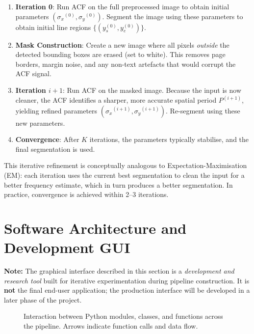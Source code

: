 \documentclass[12pt, a4paper]{article}
\begin{document}
\begin{enumerate}
    \item \textbf{Iteration 0}: Run ACF on the full preprocessed image to obtain initial parameters $({\sigma_x}^{(0)}, {\sigma_y}^{(0)})$. Segment the image using these parameters to obtain initial line regions $\{(y_s^{(0)}, y_e^{(0)})\}$.

    \item \textbf{Mask Construction}: Create a new image where all pixels \emph{outside} the detected bounding boxes are erased (set to white). This removes page borders, margin noise, and any non-text artefacts that would corrupt the ACF signal.

    \item \textbf{Iteration $i+1$}: Run ACF on the masked image. Because the input is now cleaner, the ACF identifies a sharper, more accurate spatial period $P^{(i+1)}$, yielding refined parameters $({\sigma_x}^{(i+1)}, {\sigma_y}^{(i+1)})$. Re-segment using these new parameters.

    \item \textbf{Convergence}: After $K$ iterations, the parameters typically stabilise, and the final segmentation is used.
\end{enumerate}

This iterative refinement is conceptually analogous to Expectation-Maximisation (EM): each iteration uses the current best segmentation to clean the input for a better frequency estimate, which in turn produces a better segmentation. In practice, convergence is achieved within 2--3 iterations.


\section{Software Architecture and Development GUI}

\textbf{Note:} The graphical interface described in this section is a \emph{development and research tool} built for iterative experimentation during pipeline construction. It is \textbf{not} the final end-user application; the production interface will be developed in a later phase of the project.

\begin{figure}[H]
    \centering
    \caption{Interaction between Python modules, classes, and functions across the pipeline. Arrows indicate function calls and data flow.}
    \label{fig:sw_arch}
\end{figure}
\end{document}

